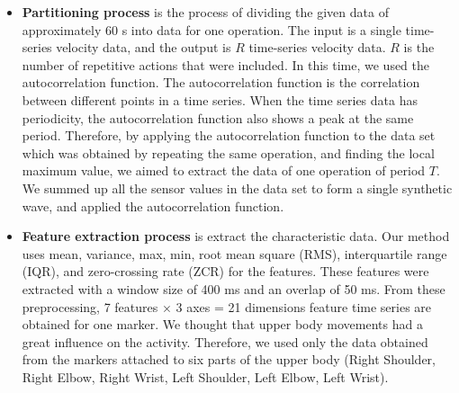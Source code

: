\documentclass[graybox]{svmult}
\begin{document}
\begin{itemize}
    \item {\bf Partitioning process} is the process of dividing the given data of approximately 60 s into data for one operation. The input is a single time-series velocity data, and the output is $R$ time-series velocity data. $R$ is the number of repetitive actions that were included. In this time, we used the autocorrelation function. The autocorrelation function is the correlation between different points in a time series. When the time series data has periodicity, the autocorrelation function also shows a peak at the same period. Therefore, by applying the autocorrelation function to the data set which was obtained by repeating the same operation, and finding the local maximum value, we aimed to extract the data of one operation of period $T$. We summed up all the sensor values in the data set to form a single synthetic wave, and applied the autocorrelation function.
    
    
    \item {\bf Feature extraction process} is extract the characteristic data. Our method uses mean, variance, max, min, root mean square (RMS), interquartile range (IQR), and zero-crossing rate (ZCR) for the features. These features were extracted with a window size of 400 ms and an overlap of 50 ms. From these preprocessing, 7 features $\times$ 3 axes = 21 dimensions feature time series are obtained for one marker. We thought that upper body movements had a great influence on the activity. Therefore, we used only the data obtained from the markers attached to six parts of the upper body (Right Shoulder, Right Elbow, Right Wrist, Left Shoulder, Left Elbow, Left Wrist).
\end{itemize}
\end{document}
